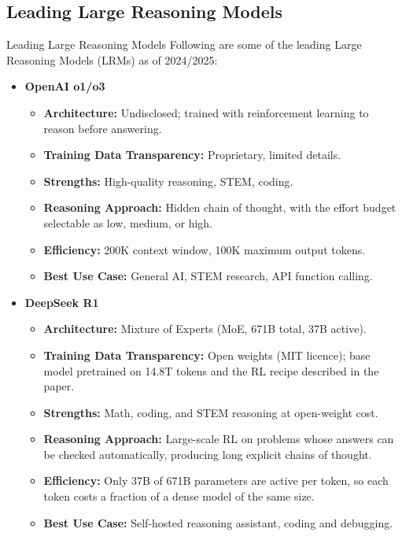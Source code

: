 \subsection{Leading Large Reasoning Models}
\begin{frame}[allowframebreaks]{Leading Large Reasoning Models}
    \large Following are some of the leading Large Reasoning Models (LRMs) as of 2024/2025:
    \vspace{0.5em}
    \begin{itemize}
        \item \textbf{OpenAI o1/o3}
        \begin{itemize}
            \item \textbf{Architecture:} Undisclosed; trained with reinforcement learning to reason before answering.
            \item \textbf{Training Data Transparency:} Proprietary, limited details.
            \item \textbf{Strengths:} High-quality reasoning, STEM, coding.
            \item \textbf{Reasoning Approach:} Hidden chain of thought, with the effort budget selectable as low, medium, or high.
            \item \textbf{Efficiency:} 200K context window, 100K maximum output tokens.
            \item \textbf{Best Use Case:} General AI, STEM research, API function calling.
        \end{itemize}
    \framebreak
        \item \textbf{DeepSeek R1}
        \begin{itemize}
            \item \textbf{Architecture:} Mixture of Experts (MoE, 671B total, 37B active).
            \item \textbf{Training Data Transparency:} Open weights (MIT licence); base model pretrained on 14.8T tokens and the RL recipe described in the paper.
            \item \textbf{Strengths:} Math, coding, and STEM reasoning at open-weight cost.
            \item \textbf{Reasoning Approach:} Large-scale RL on problems whose answers can be checked automatically, producing long explicit chains of thought.
            \item \textbf{Efficiency:} Only 37B of 671B parameters are active per token, so each token costs a fraction of a dense model of the same size.
            \item \textbf{Best Use Case:} Self-hosted reasoning assistant, coding and debugging.

\end{itemize}
\end{itemize}
\end{frame}
